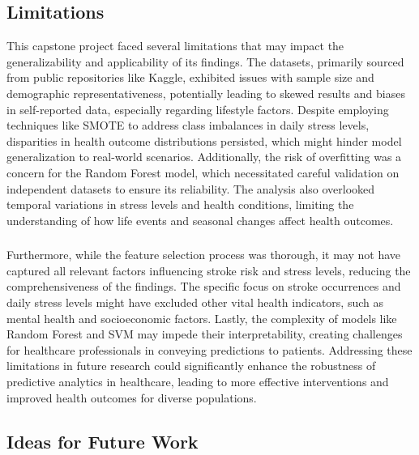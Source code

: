 \documentclass[runningheads]{llncs}
\begin{document}
\begin{enumerate}
\subsection{Limitations}

This capstone project faced several limitations that may impact the generalizability and applicability of its findings. The datasets, primarily sourced from public repositories like Kaggle, exhibited issues with sample size and demographic representativeness, potentially leading to skewed results and biases in self-reported data, especially regarding lifestyle factors. Despite employing techniques like SMOTE to address class imbalances in daily stress levels, disparities in health outcome distributions persisted, which might hinder model generalization to real-world scenarios. Additionally, the risk of overfitting was a concern for the Random Forest model, which necessitated careful validation on independent datasets to ensure its reliability. The analysis also overlooked temporal variations in stress levels and health conditions, limiting the understanding of how life events and seasonal changes affect health outcomes. 

\subsubsection{}
Furthermore, while the feature selection process was thorough, it may not have captured all relevant factors influencing stroke risk and stress levels, reducing the comprehensiveness of the findings. The specific focus on stroke occurrences and daily stress levels might have excluded other vital health indicators, such as mental health and socioeconomic factors. Lastly, the complexity of models like Random Forest and SVM may impede their interpretability, creating challenges for healthcare professionals in conveying predictions to patients. Addressing these limitations in future research could significantly enhance the robustness of predictive analytics in healthcare, leading to more effective interventions and improved health outcomes for diverse populations.

\subsection{Ideas for Future Work}


\end{enumerate}
\end{document}
